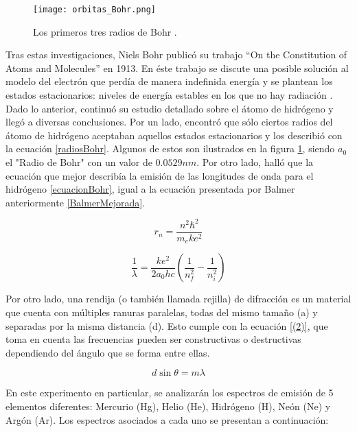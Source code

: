\documentclass[%
 reprint,
 amsmath,amssymb,
 aps,
]{revtex4-1}
\begin{document}
\begin{figure}[H]
    \centering
    \texttt{[image: orbitas\_Bohr.png]}
    \caption{Los primeros tres radios de Bohr \cite{serway2004modern}.}
    \label{fig: radios de Bohr}
\end{figure}

Tras estas investigaciones, Niels Bohr publicó su trabajo ``On the Constitution of Atoms and Molecules'' en 1913. En éste trabajo se discute una posible solución al modelo del electrón que perdía de manera indefinida energía y se plantean los estados estacionarios: niveles de energía estables en los que no hay radiación \cite{Bohr}. Dado lo anterior, continuó su estudio detallado sobre el átomo de hidrógeno y llegó a diversas conclusiones. Por un lado, encontró que sólo ciertos radios del átomo de hidrógeno aceptaban aquellos estados estacionarios y los describió con la ecuación \eqref{radiosBohr}. Algunos de estos son ilustrados en la figura \ref{fig: radios de Bohr}, siendo $a_0$ el "Radio de Bohr" con un valor de $0.0529 nm$. Por otro lado, halló que la ecuación que mejor describía la emisión de las longitudes de onda para el hidrógeno \eqref{ecuacionBohr}, igual a la ecuación presentada por Balmer anteriormente \eqref{BalmerMejorada}.

\begin{equation} \label{radiosBohr}
   r_n = \frac{n^2 \hbar^2}{m_eke^2}
\end{equation}

\begin{equation} \label{ecuacionBohr}
   \frac{1}{\lambda} = \frac{ke^2}{2a_0hc} \left(\frac{1}{n_f^2} - \frac{1}{n_i^2} \right)
\end{equation}

Por otro lado, una rendija (o también llamada rejilla) de difracción es un material que cuenta con múltiples ranuras paralelas, todas del mismo tamaño (a) y separadas por la misma distancia (d). Esto cumple con la ecuación \eqref{(2)}, que toma en cuenta las frecuencias pueden ser constructivas o destructivas dependiendo del ángulo que se forma entre ellas. 

\begin{equation} \label{(2)}
    d \sin \theta = m\lambda
\end{equation}

En este experimento en particular, se analizarán los espectros de emisión de 5 elementos diferentes: Mercurio (Hg), Helio (He), Hidrógeno (H), Neón (Ne) y Argón (Ar). Los espectros asociados a cada uno se presentan a continuación: \\
\end{document}
